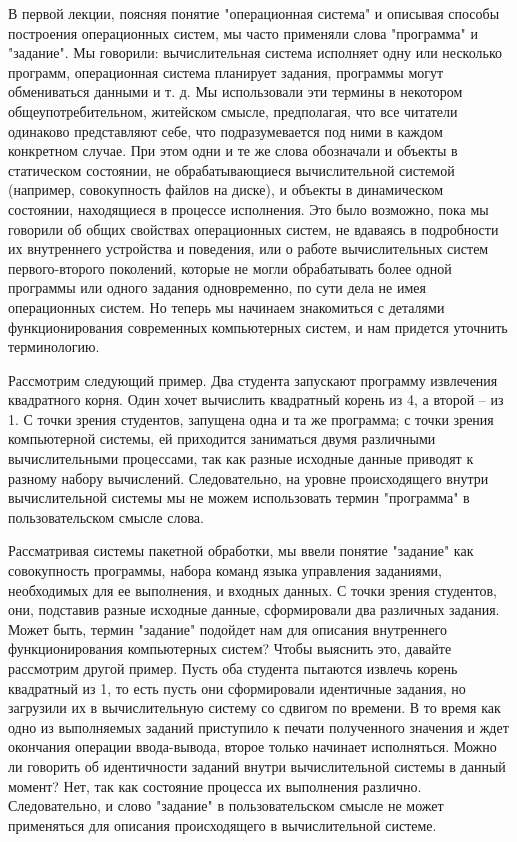 В первой лекции, поясняя понятие "операционная система" и описывая способы построения операционных систем, мы часто применяли слова "программа" и "задание". Мы говорили: вычислительная система исполняет одну или несколько программ, операционная система планирует задания, программы могут обмениваться данными и т. д. Мы использовали эти термины в некотором общеупотребительном, житейском смысле, предполагая, что все читатели одинаково представляют себе, что подразумевается под ними в каждом конкретном случае. При этом одни и те же слова обозначали и объекты в статическом состоянии, не обрабатывающиеся вычислительной системой (например, совокупность файлов на диске), и объекты в динамическом состоянии, находящиеся в процессе исполнения. Это было возможно, пока мы говорили об общих свойствах операционных систем, не вдаваясь в подробности их внутреннего устройства и поведения, или о работе вычислительных систем первого-второго поколений, которые не могли обрабатывать более одной программы или одного задания одновременно, по сути дела не имея операционных систем. Но теперь мы начинаем знакомиться с деталями функционирования современных компьютерных систем, и нам придется уточнить терминологию.

Рассмотрим следующий пример. Два студента запускают программу извлечения квадратного корня. Один хочет вычислить квадратный корень из 4, а второй – из 1. С точки зрения студентов, запущена одна и та же программа; с точки зрения компьютерной системы, ей приходится заниматься двумя различными вычислительными процессами, так как разные исходные данные приводят к разному набору вычислений. Следовательно, на уровне происходящего внутри вычислительной системы мы не можем использовать термин "программа" в пользовательском смысле слова.

Рассматривая системы пакетной обработки, мы ввели понятие "задание" как совокупность программы, набора команд языка управления заданиями, необходимых для ее выполнения, и входных данных. С точки зрения студентов, они, подставив разные исходные данные, сформировали два различных задания. Может быть, термин "задание" подойдет нам для описания внутреннего функционирования компьютерных систем? Чтобы выяснить это, давайте рассмотрим другой пример. Пусть оба студента пытаются извлечь корень квадратный из 1, то есть пусть они сформировали идентичные задания, но загрузили их в вычислительную систему со сдвигом по времени. В то время как одно из выполняемых заданий приступило к печати полученного значения и ждет окончания операции ввода-вывода, второе только начинает исполняться. Можно ли говорить об идентичности заданий внутри вычислительной системы в данный момент? Нет, так как состояние процесса их выполнения различно. Следовательно, и слово "задание" в пользовательском смысле не может применяться для описания происходящего в вычислительной системе.

